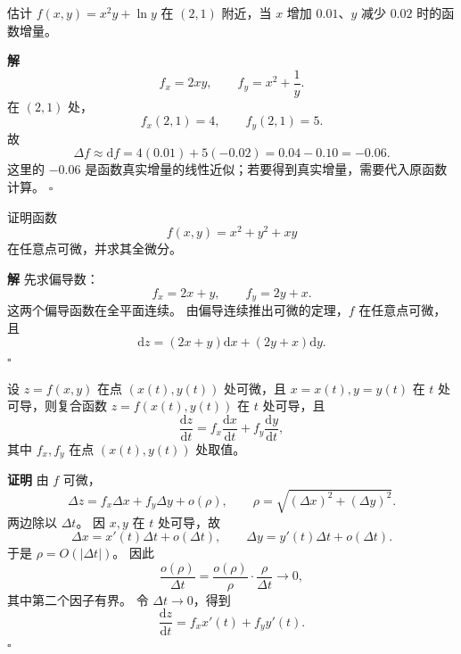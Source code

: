 \documentclass[fontset=fandol]{ctexart}
\newenvironment{proofdetail}{\par\noindent\textbf{证明}\quad}{\hfill$\square$\par\vspace{0.8em}}
\newenvironment{solution}{\par\noindent\textbf{解}\quad}{\hfill$\square$\par\vspace{0.8em}}
\newcommand{\dd}{\mathrm{d}}
\begin{document}
\begin{center}
\end{center}

\begin{example}[全微分近似]
估计 $f(x,y)=x^2y+\ln y$ 在 $(2,1)$ 附近，当 $x$ 增加 $0.01$、$y$ 减少 $0.02$ 时的函数增量。
\end{example}
\begin{solution}
\[
f_x=2xy,\qquad f_y=x^2+\frac1y.
\]
在 $(2,1)$ 处，
\[
f_x(2,1)=4,\qquad f_y(2,1)=5.
\]
故
\[
\Delta f\approx \dd f=4(0.01)+5(-0.02)=0.04-0.10=-0.06.
\]
这里的 $-0.06$ 是函数真实增量的线性近似；若要得到真实增量，需要代入原函数计算。
\end{solution}

\begin{example}[可微性判断]
证明函数
\[
f(x,y)=x^2+y^2+xy
\]
在任意点可微，并求其全微分。
\end{example}
\begin{solution}
先求偏导数：
\[
f_x=2x+y,\qquad f_y=2y+x.
\]
这两个偏导函数在全平面连续。 由偏导连续推出可微的定理，$f$ 在任意点可微，且
\[
\dd z=(2x+y)\dd x+(2y+x)\dd y.
\]
\end{solution}

\begin{theorem}
设 $z=f(x,y)$ 在点 $(x(t),y(t))$ 处可微，且 $x=x(t),y=y(t)$ 在 $t$ 处可导，则复合函数 $z=f(x(t),y(t))$ 在 $t$ 处可导，且
\[
\frac{\dd z}{\dd t}=f_x\frac{\dd x}{\dd t}+f_y\frac{\dd y}{\dd t},
\]
其中 $f_x,f_y$ 在点 $(x(t),y(t))$ 处取值。
\end{theorem}
\begin{proofdetail}
由 $f$ 可微，
\[
\Delta z=f_x\Delta x+f_y\Delta y+o(\rho),
\qquad \rho=\sqrt{(\Delta x)^2+(\Delta y)^2}.
\]
两边除以 $\Delta t$。 因 $x,y$ 在 $t$ 处可导，故
\[
\Delta x=x'(t)\Delta t+o(\Delta t),\qquad
\Delta y=y'(t)\Delta t+o(\Delta t).
\]
于是 $\rho=O(|\Delta t|)$。 因此
\[
\frac{o(\rho)}{\Delta t}
=\frac{o(\rho)}{\rho}\cdot\frac{\rho}{\Delta t}\to0,
\]
其中第二个因子有界。 令 $\Delta t\to0$，得到
\[
\frac{\dd z}{\dd t}=f_x x'(t)+f_y y'(t).
\]
\end{proofdetail}
\end{document}
